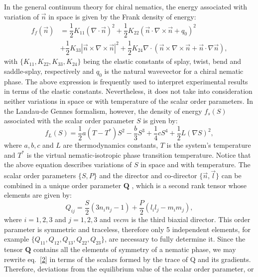 \documentclass[final,5p,times,twocolumn]{elsarticle}
\newcounter{bla}
\begin{document}
In the general continuum theory for chiral nematics, the energy associated with variation of $\vec{n}$ in space is given by the Frank density of energy:
\begin{align} \label{eq:frank_energy}\nonumber
  f_f(\vec{n})&=\dfrac{1}{2} K_{11} (\nabla \cdot  \vec{n})^2 + \dfrac{1}{2} K_{22} (\vec{n} \cdot \nabla \times \vec{n}+q_0)^2\\
 & +\dfrac{1}{2} K_{33} \left| \vec{n} \times \nabla \times \vec{n} \right|^2 
  +\dfrac{1}{2} K_{24}  \nabla \cdot \left(\vec{n} \times \nabla \times  \vec{n} +\vec{n} \cdot \nabla \vec{n} \right),
\end{align}
with $\lbrace K_{11}, K_{22}, K_{33},K_{24} \rbrace$ being the elastic
constants of splay, twist, bend and saddle-splay, respectively and $q_0$ is the natural wavevector for a chiral nematic phase. The above expression is frequently used to interpret experimental results in terms of the elastic constants.  Nevertheless, it does not take into consideration neither variations in space or with temperature of the scalar order parameters. In the Landau-de Gennes formalism, however, the density of energy $f_s(S)$ associated with the scalar order parameter $S$ is given by:
\begin{equation}
\label{2}
  f_L(S)=\dfrac{1}{2} a \left(T-T^* \right) S^2- \dfrac{b}{3} S^3+\dfrac{1}{4} c S^4 +\dfrac{1}{2} L (\nabla S)^2,
\end{equation}
where $a,b,c$ and $L$ are thermodynamics constants, $T$ is the system's temperature and $T^*$ is the virtual nematic-isotropic phase transition temperature. Notice that the above equation describes variations of $S$ in space and with temperature. The scalar order parameters $\lbrace S, P \rbrace$ and the director and co-director $\lbrace \vec{n}, \vec{l} \rbrace$ can be combined in a unique order parameter $\mathbf{Q}$ , which is a second rank tensor whose
elements are given by:
\begin{equation}\label{eq:tensorial_parameter}
  Q_{ij}=\dfrac{S}{2}( 3 n_{i} n_{j}- 1) + \dfrac{P}{2}(l_i l_j - m_i m_j),
\end{equation}
where $i=1,2,3$ and $j=1,2,3$ and $vec{m}$ is the third biaxial director.  This order parameter is symmetric and traceless, therefore only 5 independent elements, for example $\lbrace Q_{11}, Q_{12},Q_{13}, Q_{22}, Q_{23} \rbrace $, are necessary to fully determine it. Since the tensor $\mathbf{Q}$ contains all the elements of symmetry of a nematic phase, we may rewrite eq.~\eqref{2} in terms of the scalars formed by the trace of Q and its gradients. Therefore, deviations from the equilibrium value of the scalar order parameter, or
\end{document}
